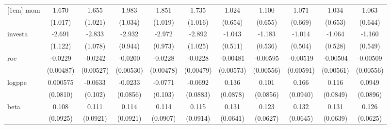 \begin{table}[htbp]
\begin{tabular}{l*{10}{c}}
[1em]
mom                 &       1.670         &       1.655         &       1.983\sym{*}  &       1.851\sym{*}  &       1.735\sym{*}  &       1.024         &       1.100\sym{*}  &       1.071         &       1.034         &       1.063         \\
                    &     (1.017)         &     (1.021)         &     (1.034)         &     (1.019)         &     (1.016)         &     (0.654)         &     (0.655)         &     (0.669)         &     (0.653)         &     (0.644)         \\
[1em]
investa             &      -2.691\sym{**} &      -2.833\sym{**} &      -2.932\sym{***}&      -2.972\sym{***}&      -2.892\sym{***}&      -1.043\sym{**} &      -1.183\sym{**} &      -1.014\sym{**} &      -1.064\sym{**} &      -1.160\sym{**} \\
                    &     (1.122)         &     (1.078)         &     (0.944)         &     (0.973)         &     (1.025)         &     (0.511)         &     (0.536)         &     (0.504)         &     (0.528)         &     (0.549)         \\
[1em]
roe                 &     -0.0229\sym{***}&     -0.0242\sym{***}&     -0.0200\sym{***}&     -0.0228\sym{***}&     -0.0228\sym{***}&    -0.00481         &    -0.00595         &    -0.00519         &    -0.00504         &    -0.00509         \\
                    &   (0.00487)         &   (0.00527)         &   (0.00530)         &   (0.00478)         &   (0.00479)         &   (0.00573)         &   (0.00556)         &   (0.00591)         &   (0.00561)         &   (0.00556)         \\
[1em]
logppe              &    0.000575         &     -0.0633         &     -0.0233         &     -0.0771         &     -0.0692         &       0.136         &       0.101         &       0.166\sym{*}  &       0.116         &      0.0949         \\
                    &    (0.0810)         &     (0.102)         &    (0.0856)         &     (0.103)         &    (0.0883)         &    (0.0878)         &    (0.0856)         &    (0.0940)         &    (0.0849)         &    (0.0896)         \\
[1em]
beta                &       0.108         &       0.111         &       0.114         &       0.114         &       0.115         &       0.131\sym{**} &       0.123\sym{*}  &       0.132\sym{**} &       0.131\sym{**} &       0.126\sym{**} \\
                    &    (0.0925)         &    (0.0921)         &    (0.0921)         &    (0.0907)         &    (0.0914)         &    (0.0641)         &    (0.0627)         &    (0.0645)         &    (0.0639)         &    (0.0625)         \\

\end{tabular}
\end{table}
